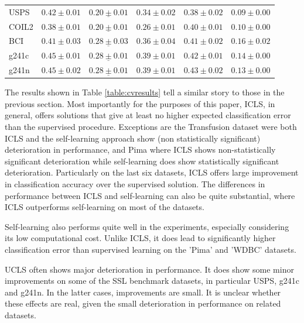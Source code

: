 \documentclass[smallcondensed]{svjour3}
\begin{document}
\begin{table}
\begin{tabular}{l|lllll}
USPS & $0.42 \pm 0.01$& $\mathbf{\underline{0.20 \pm 0.01}} $& $\mathbf{0.34 \pm 0.02} $& $\mathbf{0.38 \pm 0.02} $& $0.09 \pm 0.00$\\ 
COIL2 & $0.38 \pm 0.01$& $\mathbf{\underline{0.20 \pm 0.01}} $& $\mathbf{0.26 \pm 0.01} $& $0.40 \pm 0.01$& $0.10 \pm 0.00$\\ 
BCI & $0.41 \pm 0.03$& $\mathbf{\underline{0.28 \pm 0.03}} $& $\mathbf{0.36 \pm 0.04} $& $0.41 \pm 0.02$& $0.16 \pm 0.02$\\ 
g241c & $0.45 \pm 0.01$& $\mathbf{\underline{0.28 \pm 0.01}} $& $\mathbf{0.39 \pm 0.01} $& $\mathbf{0.42 \pm 0.01} $& $0.14 \pm 0.00$\\ 
g241n & $0.45 \pm 0.02$& $\mathbf{\underline{0.28 \pm 0.01}} $& $\mathbf{0.39 \pm 0.01} $& $\mathbf{0.43 \pm 0.02} $& $0.13 \pm 0.00$\\ 
\end{tabular}
\end{table}


The results shown in Table \ref{table:cvresults} tell a similar story to those in the previous section. Most importantly for the purposes of this paper, ICLS, in general, offers solutions that give at least no higher expected classification error than the supervised procedure. Exceptions are the Transfusion dataset were both ICLS and the self-learning approach show (non statistically significant) deterioration in performance, and Pima where ICLS shows non-statistically significant deterioration while self-learning does show statistically significant deterioration. Particularly on the last six datasets, ICLS offers large improvement in classification accuracy over the supervised solution. The differences in performance between ICLS and self-learning can also be quite substantial, where ICLS outperforms self-learning on most of the datasets. 

Self-learning also performs quite well in the experiments, especially considering its low computational cost. Unlike ICLS, it does lead to significantly higher classification error than supervised learning on the 'Pima' and 'WDBC' datasets.

UCLS often shows major deterioration in performance. It does show some minor improvements on some of the SSL benchmark datasets, in particular USPS, g241c and g241n. In the latter cases, improvements are small. It is unclear whether these effects are real, given the small deterioration in performance on related datasets.

\end{document}
